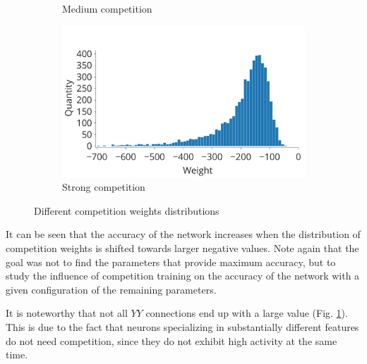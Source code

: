 \documentclass[a4paper,10pt]{article}
\begin{document}
\begin{figure}
\begin{subfigure}{0.45\textwidth}
    \caption{Medium competition} 
\end{subfigure}
\begin{subfigure}{0.45\textwidth}
    \includegraphics[width=\textwidth,keepaspectratio=true]{competition_distribution_best.pdf}
    \caption{Strong competition}
    \label{fig:best_competition}
\end{subfigure}
\caption{Different competition weights distributions}
\label{fig:competition_distributions}
\end{figure}

It can be seen that the accuracy of the network increases when the distribution of competition weights is shifted towards larger negative values. Note again that the goal was not to find the parameters that provide maximum accuracy, but to study the influence of competition training on the accuracy of the network with a given configuration of the remaining parameters.

It is noteworthy that not all $ YY $ connections end up with a large value (Fig. \ref{fig:best_competition}). This is due to the fact that neurons specializing in substantially different features do not need competition, since they do not exhibit high activity at the same time.
\end{document}
